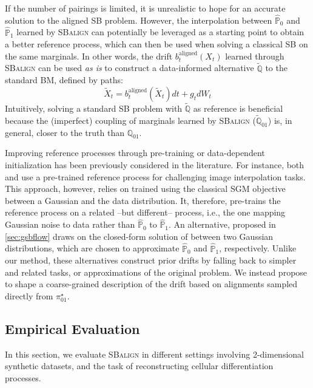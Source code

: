 If the number of pairings is limited,  it is unrealistic to hope for an accurate solution to the aligned \acrshort{SB} problem. However, the interpolation between $\hat{\mathbb{P}}_0$ and $\hat{\mathbb{P}}_1$ learned by \textsc{SBalign} can potentially be leveraged as a starting point to obtain a better reference process, which can then be used when solving a classical \acrshort{SB} on the same marginals. In other words, the drift $b^\text{aligned}_t(X_t)$ learned through \textsc{SBalign} can be used \textit{as is} to construct a data-informed alternative $\tilde{\mathbb{Q}}$ to the standard \acrshort{BM}, defined by paths:
\[
    \tilde{X}_t = b^\text{aligned}_t(\tilde{X}_t) dt + g_t dW_t
\]
Intuitively, solving a standard \acrshort{SB} problem with $\tilde{\mathbb{Q}}$ as reference is beneficial because the (imperfect) coupling of marginals learned by \textsc{SBalign} ($\tilde{\mathbb{Q}}_{01}$) is, in general, closer to the truth than $\mathbb{Q}_{01}$.

Improving reference processes through pre-training or data-dependent initialization has been previously considered in the literature. For instance, both \citet{de2021diffusion} and \citet{chen2021likelihood} use a pre-trained reference process for challenging image interpolation tasks. This approach, however, relies on  trained using the classical \acrlong{SGM} objective between a Gaussian and the data distribution. It, therefore, pre-trains the reference process on a related --but different-- process, i.e., the one mapping Gaussian noise to data rather than $\hat{\mathbb{P}}_0$ to $\hat{\mathbb{P}}_1$.
An alternative, proposed in \cref{sec:gsbflow} \citet{bunne2022recovering} draws on the closed-form solution of  between two Gaussian distributions, which are chosen to approximate $\hat{\mathbb{P}}_0$ and $\hat{\mathbb{P}}_1$, respectively.
Unlike our method, these alternatives construct prior drifts by falling back to simpler and related tasks, or approximations of the original problem. We instead propose to shape a coarse-grained description of the drift based on alignments sampled directly from $\pi^\star_{01}$. 

\subsection{Empirical Evaluation}
In this section, we evaluate \textsc{SBalign} in different settings involving 2-dimensional synthetic datasets, and the task of reconstructing cellular differentiation processes.

